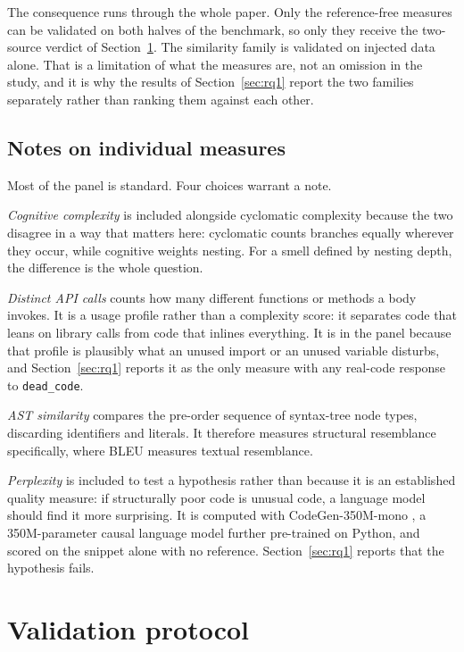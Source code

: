 \documentclass[10pt,a4paper,twocolumn]{article}
\begin{document}
The consequence runs through the whole paper. Only the reference-free measures
can be validated on both halves of the benchmark, so only they receive the
two-source verdict of Section~\ref{sec:protocol}. The similarity family is
validated on injected data alone. That is a limitation of what the measures are,
not an omission in the study, and it is why the results of
Section~\ref{sec:rq1} report the two families separately rather than ranking them
against each other.

\subsection{Notes on individual measures}

Most of the panel is standard. Four choices warrant a note.

\emph{Cognitive complexity} is included alongside cyclomatic complexity because
the two disagree in a way that matters here: cyclomatic counts branches equally
wherever they occur, while cognitive weights nesting. For a smell defined by
nesting depth, the difference is the whole question.

\emph{Distinct API calls} counts how many different functions or methods a
body invokes. It is a usage profile rather than a complexity score: it separates
code that leans on library calls from code that inlines everything. It is in the
panel because that profile is plausibly what an unused import or an unused
variable disturbs, and Section~\ref{sec:rq1} reports it as the only measure with
any real-code response to \texttt{dead\_code}.

\emph{AST similarity} compares the pre-order sequence of syntax-tree node types,
discarding identifiers and literals. It therefore measures structural
resemblance specifically, where BLEU measures textual resemblance.

\emph{Perplexity} is included to test a hypothesis rather than because it is an
established quality measure: if structurally poor code is unusual code, a
language model should find it more surprising. It is computed with
CodeGen-350M-mono \cite{nijkamp2022codegen}, a 350M-parameter causal language
model further pre-trained on Python, and scored on the snippet alone with no
reference.
Section~\ref{sec:rq1} reports that the hypothesis fails.


\section{Validation protocol}
\label{sec:protocol}
\end{document}
